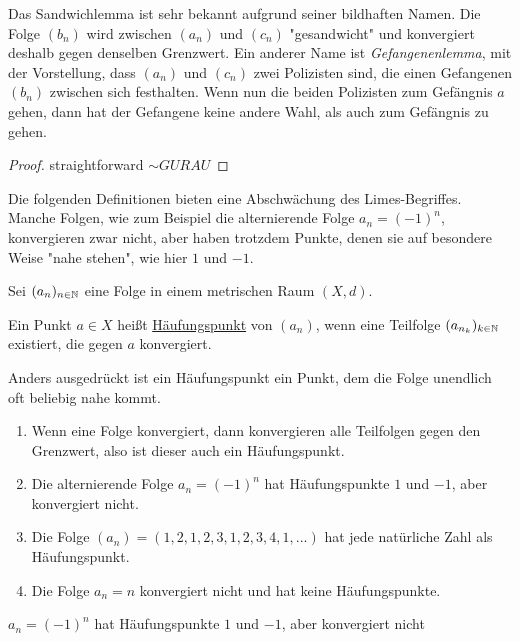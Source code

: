 Das Sandwichlemma ist sehr bekannt aufgrund seiner bildhaften Namen. Die Folge $(b_n)$ wird zwischen $(a_n)$ und $(c_n)$ "gesandwicht" und konvergiert deshalb gegen denselben Grenzwert. Ein anderer Name ist \emph{Gefangenenlemma}, mit der Vorstellung, dass $(a_n)$ und $(c_n)$ zwei Polizisten sind, die einen Gefangenen $(b_n)$ zwischen sich festhalten. Wenn nun die beiden Polizisten zum Gefängnis $a$ gehen, dann hat der Gefangene keine andere Wahl, als auch zum Gefängnis zu gehen.

\begin{proof}
    straightforward $\sim GURAU$
\end{proof}

Die folgenden Definitionen bieten eine Abschwächung des Limes-Begriffes. Manche Folgen, wie zum Beispiel die alternierende Folge $a_n = (-1)^n$, konvergieren zwar nicht, aber haben trotzdem Punkte, denen sie auf besondere Weise "nahe stehen", wie hier $1$ und $-1$.

\begin{definition}
    Sei $(a_n)_{n \in \mathbb{N}}$ eine Folge in einem metrischen Raum $(X, d)$.

    Ein Punkt $a \in X$ heißt \underline{Häufungspunkt} von $(a_n)$, wenn eine Teilfolge $(a_{n_k})_{k \in \mathbb{N}}$ existiert, die gegen $a$ konvergiert.
\end{definition}

Anders ausgedrückt ist ein Häufungspunkt ein Punkt, dem die Folge unendlich oft beliebig nahe kommt.

\begin{example}
    \begin{enumerate}
        \item Wenn eine Folge konvergiert, dann konvergieren alle Teilfolgen gegen den Grenzwert, also ist dieser auch ein Häufungspunkt.
        \item Die alternierende Folge $a_n = (-1)^n$ hat Häufungspunkte $1$ und $-1$, aber konvergiert nicht.
        \item Die Folge $(a_n) = (1, 2, 1, 2, 3, 1, 2, 3, 4, 1, ...)$ hat jede natürliche Zahl als Häufungspunkt.
        \item Die Folge $a_n = n$ konvergiert nicht und hat keine Häufungspunkte.
    \end{enumerate}
\end{example}

\begin{example}
    $a_n = (-1)^n$ hat Häufungspunkte $1$ und $-1$, aber konvergiert nicht
\end{example}

